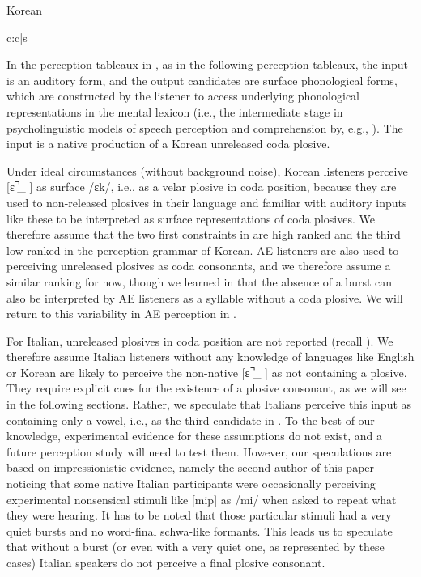 \documentclass[output=paper,colorlinks,citecolor=brown]{langscibook}
\begin{document}
\begin{table}
\caption{Korean}
\label{hamann:tabk1}
\ShadingOff
\begin{tableau}{c:c|s}
\inp{[ɛ˺\_]}            \const*{*[˺\_]/ /}   
 \vio{}              \vio{}              \vio{*}
           \vio{*!}            \vio{}              \vio{}
            \vio{}              \vio{*!}            \vio{}
\end{tableau}
\end{table}

In the perception tableaux in , as in the following perception tableaux, the input is an auditory form, and the output candidates are surface phonological forms, which are constructed by the listener to access underlying phonological representations in the mental lexicon (i.e., the intermediate stage in psycholinguistic models of speech perception and comprehension by, e.g., \cite{McQueenCutler1997}). The input  is a native production of a Korean unreleased coda plosive.

Under ideal circumstances (without background noise), Korean listeners perceive [ɛ  ̚\_ ] as surface /ɛk/, i.e., as a velar plosive in coda position, because they are used to non-released plosives in their language and familiar with auditory inputs like these to be interpreted as surface representations of coda plosives. We therefore assume that the two first constraints in  are high ranked and the third low ranked in the perception grammar of Korean. AE listeners are also used to perceiving unreleased plosives as coda consonants, and we therefore assume a similar ranking for now, though we learned in  that the absence of a burst can also be interpreted by AE listeners as a syllable without a coda plosive. We will return to this variability in AE perception in .

For Italian, unreleased plosives in coda position are not reported (recall ). We therefore assume Italian listeners without any knowledge of languages like English or Korean are likely to perceive the non-native [ɛ  ̚\_ ] as not containing a plosive. They require explicit cues for the existence of a plosive consonant, as we will see in the following sections. Rather, we speculate that Italians perceive this input as containing only a vowel, i.e., as the third candidate in . To the best of our knowledge, experimental evidence for these assumptions do not exist, and a future perception study will need to test them. However, our speculations are based on impressionistic evidence, namely the second author of this paper noticing that some native Italian participants were occasionally perceiving experimental nonsensical stimuli like [mip] as /mi/ when asked to repeat what they were hearing. It has to be noted that those particular stimuli had a very quiet bursts and no word-final schwa-like formants. This leads us to speculate that without a burst (or even with a very quiet one, as represented by these cases) Italian speakers do not perceive a final plosive consonant.
\end{document}
